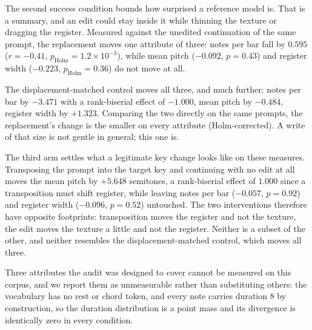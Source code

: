 \documentclass{article}
\begin{document}
The second success condition bounds how surprised a reference model is. That is a
summary, and an edit could stay inside it while thinning the texture or dragging the
register. Measured against the unedited continuation of the same prompt, the
replacement moves one attribute of three: notes per bar fall by $0.595$
($r=-0.41$, $p_{\text{Holm}}=1.2\times10^{-3}$), while mean pitch ($-0.092$, $p=0.43$)
and register width ($-0.223$, $p_{\text{Holm}}=0.36$) do not move at all.

The displacement-matched control moves all three, and much further: notes per bar by
$-3.471$ with a rank-biserial effect of $-1.000$, mean pitch by $-0.484$, register width
by $+1.323$. Comparing the two directly on the same prompts, the replacement's change is
the smaller on every attribute (Holm-corrected). A write of that size is not gentle in
general; this one is.

The third arm settles what a legitimate key change looks like on these measures.
Transposing the prompt into the target key and continuing with no edit at all moves the
mean pitch by $+5.648$ semitones, a rank-biserial effect of $1.000$ since a
transposition must shift register, while leaving notes per bar ($-0.057$, $p=0.92$)
and register width ($-0.096$, $p=0.52$) untouched. The two interventions therefore have
opposite footprints: transposition moves the register and not the texture, the edit
moves the texture a little and not the register. Neither is a subset of the other, and
neither resembles the displacement-matched control, which moves all three.

Three attributes the audit was designed to cover cannot be measured on this corpus, and
we report them as unmeasurable rather than substituting others: the vocabulary has no
rest or chord token, and every note carries duration $8$ by construction, so the
duration distribution is a point mass and its divergence is identically zero in every
condition.
\end{document}
